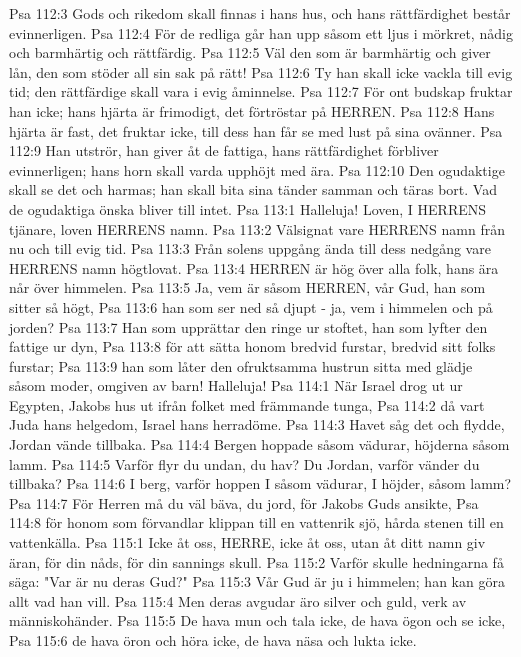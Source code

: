 Psa 112:3  Gods och rikedom skall finnas i hans hus, och hans rättfärdighet består evinnerligen.
Psa 112:4  För de redliga går han upp såsom ett ljus i mörkret, nådig och barmhärtig och rättfärdig.
Psa 112:5  Väl den som är barmhärtig och giver lån, den som stöder all sin sak på rätt!
Psa 112:6  Ty han skall icke vackla till evig tid; den rättfärdige skall vara i evig åminnelse.
Psa 112:7  För ont budskap fruktar han icke; hans hjärta är frimodigt, det förtröstar på HERREN.
Psa 112:8  Hans hjärta är fast, det fruktar icke, till dess han får se med lust på sina ovänner.
Psa 112:9  Han utströr, han giver åt de fattiga, hans rättfärdighet förbliver evinnerligen; hans horn skall varda upphöjt med ära.
Psa 112:10  Den ogudaktige skall se det och harmas; han skall bita sina tänder samman och täras bort. Vad de ogudaktiga önska bliver till intet.
Psa 113:1  Halleluja! Loven, I HERRENS tjänare, loven HERRENS namn.
Psa 113:2  Välsignat vare HERRENS namn från nu och till evig tid.
Psa 113:3  Från solens uppgång ända till dess nedgång vare HERRENS namn högtlovat.
Psa 113:4  HERREN är hög över alla folk, hans ära når över himmelen.
Psa 113:5  Ja, vem är såsom HERREN, vår Gud, han som sitter så högt,
Psa 113:6  han som ser ned så djupt - ja, vem i himmelen och på jorden?
Psa 113:7  Han som upprättar den ringe ur stoftet, han som lyfter den fattige ur dyn,
Psa 113:8  för att sätta honom bredvid furstar, bredvid sitt folks furstar;
Psa 113:9  han som låter den ofruktsamma hustrun sitta med glädje såsom moder, omgiven av barn! Halleluja!
Psa 114:1  När Israel drog ut ur Egypten, Jakobs hus ut ifrån folket med främmande tunga,
Psa 114:2  då vart Juda hans helgedom, Israel hans herradöme.
Psa 114:3  Havet såg det och flydde, Jordan vände tillbaka.
Psa 114:4  Bergen hoppade såsom vädurar, höjderna såsom lamm.
Psa 114:5  Varför flyr du undan, du hav? Du Jordan, varför vänder du tillbaka?
Psa 114:6  I berg, varför hoppen I såsom vädurar, I höjder, såsom lamm?
Psa 114:7  För Herren må du väl bäva, du jord, för Jakobs Guds ansikte,
Psa 114:8  för honom som förvandlar klippan till en vattenrik sjö, hårda stenen till en vattenkälla.
Psa 115:1  Icke åt oss, HERRE, icke åt oss, utan åt ditt namn giv äran, för din nåds, för din sannings skull.
Psa 115:2  Varför skulle hedningarna få säga: "Var är nu deras Gud?"
Psa 115:3  Vår Gud är ju i himmelen; han kan göra allt vad han vill.
Psa 115:4  Men deras avgudar äro silver och guld, verk av människohänder.
Psa 115:5  De hava mun och tala icke, de hava ögon och se icke,
Psa 115:6  de hava öron och höra icke, de hava näsa och lukta icke.
